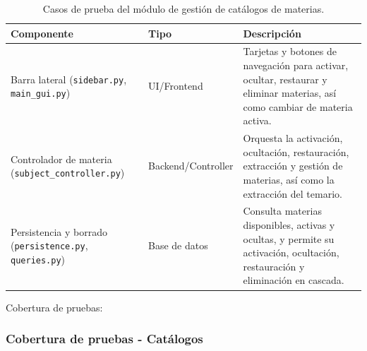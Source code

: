 \documentclass[11pt]{article}
\begin{document}
\begin{table}[H]
    \centering
    \begin{tabular}{|L{0.34\textwidth}|L{0.18\textwidth}|L{0.38\textwidth}|}
        \hline
        \textbf{Componente} & \textbf{Tipo} & \textbf{Descripción} \\ \hline
        Barra lateral (\texttt{sidebar.py}, \texttt{main\_gui.py}) & UI/Frontend & Tarjetas y botones de navegación para activar, ocultar, restaurar y eliminar materias, así como cambiar de materia activa. \\ \hline
        Controlador de materia (\texttt{subject\_controller.py}) & Backend/Controller & Orquesta la activación, ocultación, restauración, extracción y gestión de materias, así como la extracción del temario. \\ \hline
        Persistencia y borrado (\texttt{persistence.py}, \texttt{queries.py}) & Base de datos & Consulta materias disponibles, activas y ocultas, y permite su activación, ocultación, restauración y eliminación en cascada. \\ \hline
    \end{tabular}
    \caption{Casos de prueba del módulo de gestión de catálogos de materias.}
    \label{tab:casos-prueba-modulo-catalogos}
\end{table}

\newpage
Cobertura de pruebas:
\subsubsection*{Cobertura de pruebas - Catálogos}
\end{document}
